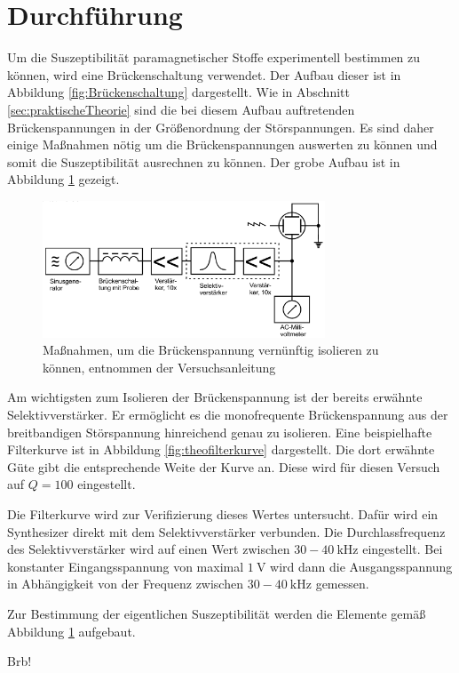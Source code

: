 \FloatBarrier
\section{Durchführung}
\label{sec:Durchführung}

Um die Suszeptibilität paramagnetischer Stoffe experimentell bestimmen zu können, wird eine Brückenschaltung verwendet.
Der Aufbau dieser ist in Abbildung \ref{fig:Brückenschaltung} dargestellt.
Wie in Abschnitt \ref{sec:praktischeTheorie} sind die bei diesem Aufbau auftretenden Brückenspannungen in der Größenordnung der Störspannungen.
Es sind daher einige Maßnahmen nötig um die Brückenspannungen auswerten zu können und somit die Suszeptibilität ausrechnen zu können.
Der grobe Aufbau ist in Abbildung \ref{fig:Aufbau} gezeigt.

\begin{figure}
  \centering
  \includegraphics[width=0.75\textwidth]{images/Aufbau.png}
  \caption{Maßnahmen, um die Brückenspannung vernünftig isolieren zu können, entnommen der Versuchsanleitung\cite[183]{sample}}
  \label{fig:Aufbau}
\end{figure}

 Am wichtigsten zum Isolieren der Brückenspannung ist der bereits erwähnte Selektivverstärker.
 Er ermöglicht es die monofrequente Brückenspannung aus der breitbandigen Störspannung hinreichend genau zu isolieren.
 Eine beispielhafte Filterkurve ist in Abbildung \ref{fig:theofilterkurve} dargestellt.
 Die dort erwähnte Güte gibt die entsprechende Weite der Kurve an.
 Diese wird für diesen Versuch auf $Q = 100$ eingestellt.

 Die Filterkurve wird zur Verifizierung dieses Wertes untersucht.
 Dafür wird ein Synthesizer direkt mit dem Selektivverstärker verbunden.
 Die Durchlassfrequenz des Selektivverstärker wird auf einen Wert zwischen $30 - \SI{40}{\kilo\hertz}$ eingestellt.
 Bei konstanter Eingangsspannung von maximal $\SI{1}{\volt}$ wird dann die Ausgangsspannung in Abhängigkeit von der Frequenz zwischen $30 - \SI{40}{\kilo\hertz}$ gemessen.

Zur Bestimmung der eigentlichen Suszeptibilität werden die Elemente gemäß Abbildung \ref{fig:Aufbau} aufgebaut.

Brb!
